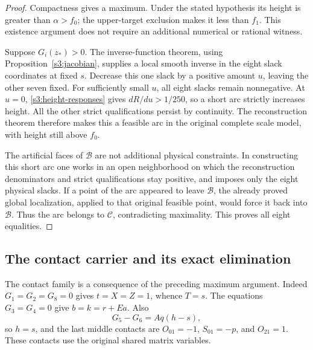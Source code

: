 \documentclass[11pt,reqno]{amsart}
\theoremstyle{definition}
\theoremstyle{remark}
\begin{document}
\begin{proof}
Compactness gives a maximum. Under the stated hypothesis its height
is greater than \(\alpha>f_0\); the upper-target exclusion makes
it less than \(f_1\). This existence argument does not require an
additional numerical or rational witness.

Suppose \(G_i(z_*)>0\). The inverse-function theorem, using
Proposition~\ref{s3:jacobian}, supplies a local smooth inverse in
the eight slack coordinates at fixed \(s\). Decrease this one
slack by a positive amount \(u\), leaving the other seven fixed.
For sufficiently small \(u\), all eight slacks remain nonnegative.
At \(u=0\), \eqref{s3:height-responses} gives
\(dR/du>1/250\), so a short arc strictly increases height.
All the other strict qualifications persist by continuity. The
reconstruction theorem therefore makes this a feasible arc in the
original complete scale model, with height still above \(f_0\).

The artificial faces of \(\mathcal B\) are not additional
physical constraints. In constructing this short arc one works in
an open neighborhood on which the reconstruction denominators and
strict qualifications stay positive, and imposes only the eight
physical slacks. If a point of the arc appeared to leave
\(\mathcal B\), the already proved global localization, applied
to that original feasible point, would force it back into
\(\mathcal B\). Thus the arc belongs to \(\mathcal C\),
contradicting maximality. This proves all eight equalities.
\end{proof}

\subsection{The contact carrier and its exact elimination}
\label{s3:carrier-section}

The contact family is a consequence of the preceding maximum argument.
Indeed \(G_1=G_2=G_8=0\) gives \(t=X=Z=1\), whence
\(T=s\). The equations \(G_3=G_4=0\) give
\(b=k=r+Ea\). Also
\[
 G_5-G_6=Aq(h-s),
\]
so \(h=s\), and the last middle contacts are
\(O_{01}=-1\), \(S_{01}=-p\), and \(O_{21}=1\).
These contacts use the original shared matrix variables.
\end{document}
